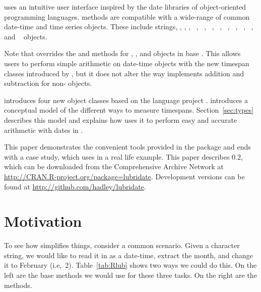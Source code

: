 \documentclass[article]{jss}
\begin{document}
 uses an intuitive user interface inspired by the date libraries of object-oriented programming languages.   methods are compatible with a wide-range of common date-time and time series objects. These include  strings, , , ,  ~\citep{chron},  ~\citep{timeDate},  ~\citep{zoo},  ~\citep{xts},  ~\citep{its},  ~\citep{tis},  ~\citep{timeSeries},  ~\citep{fts}, and  ~\citep{tseries} objects. 

Note that  overrides the \code{+} and \code{-} methods for , , and  objects in base . This allows users to perform simple arithmetic on date-time objects with the new timespan classes introduced by , but it does not alter the way  implements addition and subtraction for non- objects.

 introduces four new object classes based on the  language  project \citep{jodatime}.  introduces a conceptual model of the different ways to measure timespans. Section~\ref{sec:types} describes this model and explains how  uses it to perform easy and accurate arithmetic with dates in . 



This paper demonstrates the convenient tools provided in the  package and ends with a case study, which uses  in a real life example. This paper describes  0.2, which can be downloaded from the Comprehensive  Archive Network at \url{http://CRAN.R-project.org/package=lubridate}. Development versions can be found at \url{http://github.com/hadley/lubridate}.

\section{Motivation}

To see how  simplifies things, consider a common scenario. Given a character string, we would like to read it in as a date-time, extract the month, and change it to February (i.e,~2). Table~\ref{tab:Rlub} shows two ways we could do this. On the left are the base  methods we would use for these three tasks.  On the right are the  methods.
\end{document}
